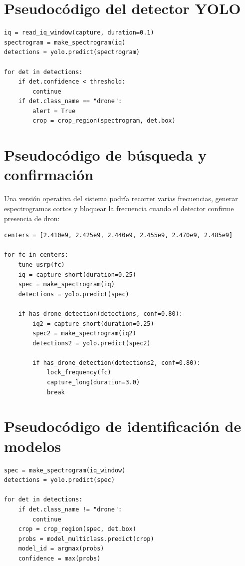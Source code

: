 \section{Pseudocódigo del detector YOLO}
\label{anexo:pseudocodigo_detector_yolo}

\begin{lstlisting}[style=python,caption={Pseudocódigo de inferencia del detector YOLO.}]
iq = read_iq_window(capture, duration=0.1)
spectrogram = make_spectrogram(iq)
detections = yolo.predict(spectrogram)

for det in detections:
    if det.confidence < threshold:
        continue
    if det.class_name == "drone":
        alert = True
        crop = crop_region(spectrogram, det.box)
\end{lstlisting}

\section{Pseudocódigo de búsqueda y confirmación}
\label{anexo:pseudocodigo_busqueda}

Una versión operativa del sistema podría recorrer varias frecuencias, generar espectrogramas cortos y bloquear la frecuencia cuando el detector confirme presencia de dron:

\begin{lstlisting}[style=python,caption={Pseudocódigo de búsqueda y confirmación con YOLO.}]
centers = [2.410e9, 2.425e9, 2.440e9, 2.455e9, 2.470e9, 2.485e9]

for fc in centers:
    tune_usrp(fc)
    iq = capture_short(duration=0.25)
    spec = make_spectrogram(iq)
    detections = yolo.predict(spec)

    if has_drone_detection(detections, conf=0.80):
        iq2 = capture_short(duration=0.25)
        spec2 = make_spectrogram(iq2)
        detections2 = yolo.predict(spec2)

        if has_drone_detection(detections2, conf=0.80):
            lock_frequency(fc)
            capture_long(duration=3.0)
            break
\end{lstlisting}

\section{Pseudocódigo de identificación de modelos}
\label{anexo:pseudocodigo_modelos}

\begin{lstlisting}[style=python,caption={Pseudocódigo de clasificación multiclase como segunda etapa.}]
spec = make_spectrogram(iq_window)
detections = yolo.predict(spec)

for det in detections:
    if det.class_name != "drone":
        continue
    crop = crop_region(spec, det.box)
    probs = model_multiclass.predict(crop)
    model_id = argmax(probs)
    confidence = max(probs)
\end{lstlisting}

